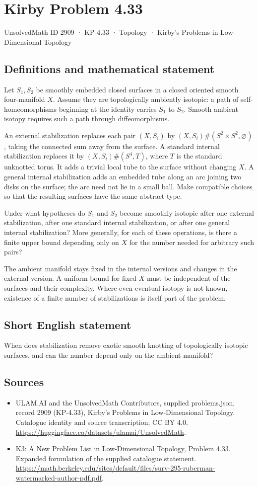 \documentclass[11pt,a4paper]{article}
\begin{document}
\section*{Kirby Problem 4.33}\label{2909}
{\small UnsolvedMath ID 2909 · KP-4.33 · Topology · Kirby's Problems in Low-Dimensional Topology}
\subsection{Definitions and mathematical statement}
Let $S_1,S_2$ be smoothly embedded closed surfaces in a closed oriented smooth four-manifold $X$. Assume they are topologically ambiently isotopic: a path of self-homeomorphisms beginning at the identity carries $S_1$ to $S_2$. Smooth ambient isotopy requires such a path through diffeomorphisms.

An external stabilization replaces each pair $(X,S_i)$ by $(X,S_i)\#(S^2\times S^2,\varnothing)$, taking the connected sum away from the surface. A standard internal stabilization replaces it by $(X,S_i)\#(S^4,T)$, where $T$ is the standard unknotted torus. It adds a trivial local tube to the surface without changing $X$. A general internal stabilization adds an embedded tube along an arc joining two disks on the surface; the arc need not lie in a small ball. Make compatible choices so that the resulting surfaces have the same abstract type.

Under what hypotheses do $S_1$ and $S_2$ become smoothly isotopic after one external stabilization, after one standard internal stabilization, or after one general internal stabilization? More generally, for each of these operations, is there a finite upper bound depending only on $X$ for the number needed for arbitrary such pairs?

The ambient manifold stays fixed in the internal versions and changes in the external version. A uniform bound for fixed $X$ must be independent of the surfaces and their complexity. Where even eventual isotopy is not known, existence of a finite number of stabilizations is itself part of the problem.
\subsection{Short English statement}
When does stabilization remove exotic smooth knotting of topologically isotopic surfaces, and can the number depend only on the ambient manifold?
\subsection{Sources}
\begin{itemize}
\item[S1] ULAM.AI and the UnsolvedMath Contributors, supplied problems.json, record 2909 (KP-4.33), Kirby's Problems in Low-Dimensional Topology. Catalogue identity and source transcription; CC BY 4.0.
\url{https://huggingface.co/datasets/ulamai/UnsolvedMath}.
\item[S2] K3: A New Problem List in Low-Dimensional Topology, Problem 4.33. Expanded formulation of the supplied catalogue statement.
\url{https://math.berkeley.edu/sites/default/files/surv-295-ruberman-watermarked-author-pdf.pdf}.
\end{itemize}
\end{document}
